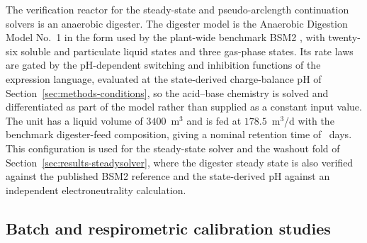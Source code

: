 \documentclass{article}
\begin{document}
The verification reactor for the steady-state and pseudo-arclength continuation solvers is an anaerobic digester. The digester model is the Anaerobic Digestion Model No.~1 \citep{batstone2002} in the form used by the plant-wide benchmark BSM2 \citep{jeppsson2007, gernaey2014}, with twenty-six soluble and particulate liquid states and three gas-phase states. Its rate laws are gated by the pH-dependent switching and inhibition functions of the expression language, evaluated at the state-derived charge-balance pH of Section~\ref{sec:methods-conditions}, so the acid--base chemistry is solved and differentiated as part of the model rather than supplied as a constant input value. The unit has a liquid volume of \(3400\)~m\(^3\) and is fed at \(178.5\)~m\(^3\)/d with the benchmark digester-feed composition, giving a nominal retention time of \SteadySRTnominal~days. This configuration is used for the steady-state solver and the washout fold of Section~\ref{sec:results-steadysolver}, where the digester steady state is also verified against the published BSM2 reference and the state-derived pH against an independent electroneutrality calculation.

\subsection{Batch and respirometric calibration studies}
\label{sec:methods-calibstudy}
\end{document}
